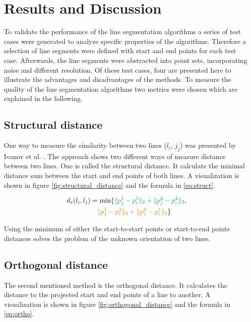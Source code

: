 \documentclass{scp}
\begin{document}
\section{Results and Discussion} 
To validate the performance of the line segmentation algorithms a series of test cases were generated to analyze specific properties of the algorithms. 
Therefore a selection of line segments were defined with start and end points for each test case. Afterwards, the line segments were abstracted into point sets, incorporating noise and different resolution. Of these test cases, four are presented here to illustrate the advantages and disadvantages of the methods. To measure the quality of the line segmentation algorithms two metrics were chosen which are explained in the following.

\subsection*{Structural distance} \label{sec:struct}
One way to measure the similarity between two lines ($l_i$, $j_j$) was presented by Ivanov et al. \cite{Ivanov}. The approach shows two different ways of measure distance between two lines. One is called the structural distance. It calculate the minimal distance sum between the start and end points of both lines. A visualization is shown in figure \ref{fig:structural_distance} and the formula in \eqref{eq:struct}.

\begin{align}
    d_s(l_i, l_j) &= \min\{\color{uzlblue} \|p_j^1 - p_i^1\|_2 + \|p_j^2 - p_i^2\|_2\color{black}, \nonumber \\
    &\quad \color{uzllightorange} \|p_j^1 - p_i^2\|_2 + \|p_j^2 - p_i^1\|_2 \color{black} \} \label{eq:struct}
\end{align}

Using the minimum of either the start-to-start points or start-to-end points distances solves the problem of the unknown orientation of two lines.

% 

\subsection*{Orthogonal distance} \label{sec:ortho}
The second mentioned method is the orthogonal distance. It calculates the distance to the projected start and end points of a line to another. A visualization is shown in figure \ref{fig:orthogonal_distance} and the formula in \eqref{eq:ortho}. 
\end{document}
